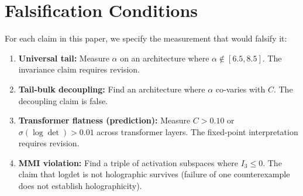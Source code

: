 \documentclass[12pt,a4paper]{article}
\begin{document}
\section{Falsification Conditions}

For each claim in this paper, we specify the measurement that would falsify it:

\begin{enumerate}
    \item \textbf{Universal tail:} Measure $\alpha$ on an architecture where $\alpha \notin [6.5, 8.5]$. The invariance claim requires revision.
    \item \textbf{Tail-bulk decoupling:} Find an architecture where $\alpha$ co-varies with $C$. The decoupling claim is false.
    \item \textbf{Transformer flatness (prediction):} Measure $C > 0.10$ or $\sigma(\log\det) > 0.01$ across transformer layers. The fixed-point interpretation requires revision.
    \item \textbf{MMI violation:} Find a triple of activation subspaces where $I_3 \leq 0$. The claim that logdet is not holographic survives (failure of one counterexample does not establish holographicity).
\end{enumerate}
\end{document}
